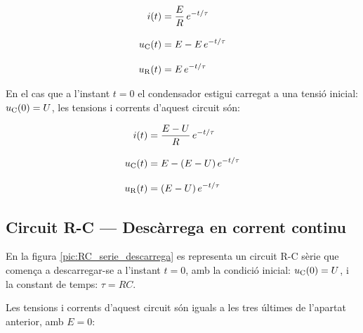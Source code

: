 \hfill
\begin{minipage}[b]{9cm}
    
\end{minipage}
\hfill
\begin{minipage}[b]{6cm}
    \begin{align}
        i(t) &= \frac{E}{R}\,e^{-t/\tau}\label{eq:RC-carrega} \\[3mm]
        u_\mathrm{C}(t) &= E  - E\, e^{-t/\tau}  \\[3mm]
        u_\mathrm{R}(t) &= E\,e^{-t/\tau}
    \end{align}
\end{minipage}

\vspace{5mm}
En el cas que a l'instant $t=0$ el condensador  estigui carregat a una tensió inicial: $u_\mathrm{C}(0) = U$, les tensions i corrents d'aquest circuit són:

\hfill
\begin{minipage}[b]{9cm}
    
\end{minipage}
\hfill
\begin{minipage}[b]{6cm}
    \begin{align}
        i(t) &= \frac{E-U}{R}\,e^{-t/\tau} \\[3mm]
        u_\mathrm{C}(t) &= E  - (E-U) \,e^{-t/\tau}  \\[3mm]
        u_\mathrm{R}(t) &= (E-U)\,e^{-t/\tau}
    \end{align}
\end{minipage}


\subsection{Circuit R-C --- Descàrrega en corrent continu}\label{sec:RC-descarrega}

En la figura \vref{pic:RC_serie_descarrega} es representa un circuit R-C sèrie que comença a descarregar-se a l'instant $t=0$, amb la condició inicial: $u_\mathrm{C}(0) = U$, i la constant de temps: $\tau = R C$.
\begin{center}
    
    \label{pic:RC_serie_descarrega}
\end{center}

Les tensions i corrents d'aquest circuit són iguals a les tres últimes de l'apartat anterior, amb $E=0$:

